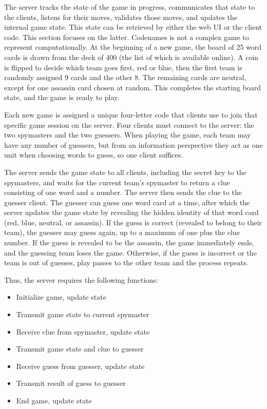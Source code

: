 \documentclass[phd,electronic,oneside,twosidetoc,letterpaper,chaptercenter,parttop,lof]{byumsphd}
\begin{document}
The server tracks the state of the game in progress, communicates that state to the clients, listens for their moves, validates those moves, and updates the internal game state. This state can be retrieved by either the web UI or the client code. This section focuses on the latter. Codenames is not a complex game to represent computationally. At the beginning of a new game, the board of 25 word cards is drawn from the deck of 400 (the list of which is available online). A coin is flipped to decide which team goes first, red or blue, then the first team is randomly assigned 9 cards and the other 8. The remaining cards are neutral, except for one assassin card chosen at random. This completes the starting board state, and the game is ready to play.

Each new game is assigned a unique four-letter code that clients use to join that specific game session on the server. Four clients must connect to the server: the two spymasters and the two guessers. When playing the game, each team may have any number of guessers, but from an information perspective they act as one unit when choosing words to guess, so one client suffices. 

The server sends the game state to all clients, including the secret key to the spymasters, and waits for the current team's spymaster to return a clue consisting of one word and a number. The server then sends the clue to the guesser client. The guesser can guess one word card at a time, after which the server updates the game state by revealing the hidden identity of that word card (red, blue, neutral, or assassin). If the guess is correct (revealed to belong to their team), the guesser may guess again, up to a maximum of one plus the clue number. If the guess is revealed to be the assassin, the game immediately ends, and the guessing team loses the game. Otherwise, if the guess is incorrect or the team is out of guesses, play passes to the other team and the process repeats. 

Thus, the server requires the following functions:

\begin{itemize}
    \setlength{\itemindent}{2em}
    \item Initialize game, update state
    \item Transmit game state to current spymaster
    \item Receive clue from spymaster, update state
    \item Transmit game state and clue to guesser
    \item Receive guess from guesser, update state
    \item Transmit result of guess to guesser
    \item End game, update state
\end{itemize}
\end{document}
